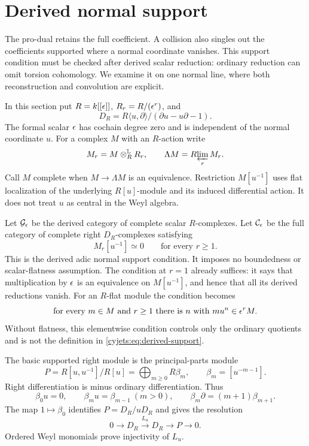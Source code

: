 \section{Derived normal support}
\label{cyjets:sec:normal-support}

The pro-dual retains the full coefficient. A collision also singles out
the coefficients supported where a normal coordinate vanishes. This
support condition must be checked after derived scalar reduction:
ordinary reduction can omit torsion cohomology. We examine it on one
normal line, where both reconstruction and convolution are explicit.

In this section put $R=k[[\epsilon]]$, $R_r=R/(\epsilon^r)$, and
\[
 D_R=R\langle u,\partial\rangle/(\partial u-u\partial-1).
\]
The formal scalar $\epsilon$ has cochain degree zero and is independent
of the normal coordinate $u$.
For a complex $M$ with an $R$-action write
\[
 M_r=M\otimes_R^{\mathbb L}R_r,\qquad
 \Lambda M=R\!\varprojlim_r M_r.
\]
Call $M$ complete when $M\to\Lambda M$ is an equivalence.
Restriction $M[u^{-1}]$ uses flat localization of the underlying
$R[u]$-module and its induced differential action. It does not treat
$u$ as central in the Weyl algebra.

Let $\mathcal G_\epsilon$ be the derived category of complete scalar
$R$-complexes. Let $\mathcal C_\epsilon$ be the full category of complete
right $D_R$-complexes satisfying
\begin{equation}\label{cyjets:eq:derived-support}
 M_r[u^{-1}]\simeq0\qquad\text{for every }r\geq1.
\end{equation}
This is the derived adic normal support condition. It imposes no
boundedness or scalar-flatness assumption. The condition at $r=1$
already suffices: it says that multiplication by $\epsilon$ is an
equivalence on $M[u^{-1}]$, and hence that all its derived reductions
vanish. For an $R$-flat module the condition becomes
\[
 \text{for every }m\in M\text{ and }r\geq1\text{ there is }n
       \text{ with }mu^n\in\epsilon^rM.
\]
Without flatness, this elementwise condition controls only the
ordinary quotients and is not the definition in
\eqref{cyjets:eq:derived-support}.

The basic supported right module is the principal-parts module
\begin{equation}\label{cyjets:eq:normal-parts}
 P=R[u,u^{-1}]/R[u]=\bigoplus_{m\geq0}R\beta_m,
 \qquad \beta_m=[u^{-m-1}].
\end{equation}
Right differentiation is minus ordinary differentiation. Thus
\[
 \beta_0u=0,\qquad \beta_mu=\beta_{m-1}\ (m>0),\qquad
 \beta_m\partial=(m+1)\beta_{m+1}.
\]
The map $1\mapsto\beta_0$ identifies $P=D_R/uD_R$ and gives
the resolution
\begin{equation}\label{cyjets:eq:normal-resolution}
 0\longrightarrow D_R\xrightarrow{L_u}D_R
                       \longrightarrow P\longrightarrow0.
\end{equation}
Ordered Weyl monomials prove injectivity of $L_u$.

